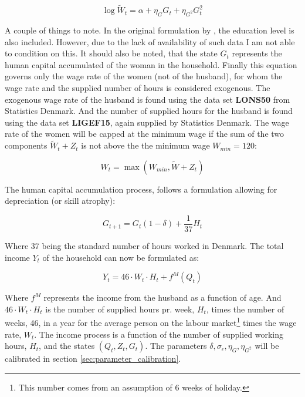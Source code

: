 \begin{equation}
    \log \tilde{W}_t = \alpha + \eta_G G_t + \eta_{G^2} G_t^2
\end{equation}

A couple of things to note. In the original formulation by \textcite{lemieux_mincer_2006}, the education level is also included. However, due to the lack of availability of such data I am not able to condition on this. It should also be noted, that the state $G_t$ represents the human capital accumulated of the woman in the household. Finally this equation governs only the wage rate of the women (not of the husband), for whom the wage rate and the supplied number of hours is considered exogenous. The exogenous wage rate of the husband is found using the data set \textbf{LONS50} from Statistics Denmark. And the number of supplied hours for the husband is found using the data set \textbf{LIGEF15}, again supplied by Statistics Denmark. The wage rate of the women will be capped at the minimum wage if the sum of the two components $\tilde{W}_t + Z_t$ is not above the the minimum wage $W_{min} = 120$: 

\begin{equation}
    W_t = \max ( W_{min}, \tilde{W} + Z_t)
\end{equation}

The human capital accumulation process, follows a formulation allowing for depreciation (or skill atrophy):

\begin{equation}
    G_{t+1} = G_t (1-\delta)  + \frac{1}{37} H_t 
\end{equation}

Where 37 being the standard number of hours worked in Denmark. The total income $Y_t$ of the household can now be formulated as:

\begin{equation}
    Y_t = 46 \cdot W_t \cdot H_t + f^M(Q_t)
\end{equation}

Where $f^M$ represents the income from the husband as a function of age. And $46 \cdot W_t \cdot H_t$ is the number of supplied hours pr. week, $H_t$, times the number of weeks, 46, in a year for the average person on the labour market\footnote{This number comes from an assumption of 6 weeks of holiday.} times the wage rate, $W_t$. The income process is a function of the number of supplied working hours, $H_t$, and the states $(Q_t, Z_t, G_t)$. The parameters $\delta, \sigma_\epsilon, \eta_G, \eta_{G^{2}}$ will be calibrated in section \ref{sec:parameter_calibration}.

